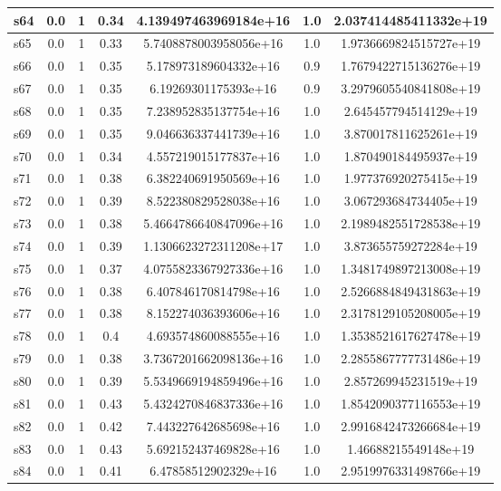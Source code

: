 \documentclass{article}
\begin{document}
\begin{tabular}{|l|c|c|c|c|c|c|}
\hline
s64 &0.0 & 1 & 0.34 & 4.139497463969184e+16 & 1.0 & 2.037414485411332e+19\\
\hline
s65 &0.0 & 1 & 0.33 & 5.7408878003958056e+16 & 1.0 & 1.9736669824515727e+19\\
\hline
s66 &0.0 & 1 & 0.35 & 5.178973189604332e+16 & 0.9 & 1.7679422715136276e+19\\
\hline
s67 &0.0 & 1 & 0.35 & 6.19269301175393e+16 & 0.9 & 3.2979605540841808e+19\\
\hline
s68 &0.0 & 1 & 0.35 & 7.238952835137754e+16 & 1.0 & 2.645457794514129e+19\\
\hline
s69 &0.0 & 1 & 0.35 & 9.046636337441739e+16 & 1.0 & 3.870017811625261e+19\\
\hline
s70 &0.0 & 1 & 0.34 & 4.557219015177837e+16 & 1.0 & 1.870490184495937e+19\\
\hline
s71 &0.0 & 1 & 0.38 & 6.382240691950569e+16 & 1.0 & 1.977376920275415e+19\\
\hline
s72 &0.0 & 1 & 0.39 & 8.522380829528038e+16 & 1.0 & 3.067293684734405e+19\\
\hline
s73 &0.0 & 1 & 0.38 & 5.4664786640847096e+16 & 1.0 & 2.1989482551728538e+19\\
\hline
s74 &0.0 & 1 & 0.39 & 1.1306623272311208e+17 & 1.0 & 3.873655759272284e+19\\
\hline
s75 &0.0 & 1 & 0.37 & 4.0755823367927336e+16 & 1.0 & 1.3481749897213008e+19\\
\hline
s76 &0.0 & 1 & 0.38 & 6.407846170814798e+16 & 1.0 & 2.5266884849431863e+19\\
\hline
s77 &0.0 & 1 & 0.38 & 8.152274036393606e+16 & 1.0 & 2.3178129105208005e+19\\
\hline
s78 &0.0 & 1 & 0.4 & 4.693574860088555e+16 & 1.0 & 1.3538521617627478e+19\\
\hline
s79 &0.0 & 1 & 0.38 & 3.7367201662098136e+16 & 1.0 & 2.2855867777731486e+19\\
\hline
s80 &0.0 & 1 & 0.39 & 5.5349669194859496e+16 & 1.0 & 2.857269945231519e+19\\
\hline
s81 &0.0 & 1 & 0.43 & 5.4324270846837336e+16 & 1.0 & 1.8542090377116553e+19\\
\hline
s82 &0.0 & 1 & 0.42 & 7.443227642685698e+16 & 1.0 & 2.9916842473266684e+19\\
\hline
s83 &0.0 & 1 & 0.43 & 5.692152437469828e+16 & 1.0 & 1.46688215549148e+19\\
\hline
s84 &0.0 & 1 & 0.41 & 6.47858512902329e+16 & 1.0 & 2.9519976331498766e+19\\
\hline

\end{tabular}
\end{document}
